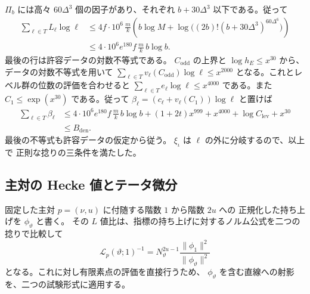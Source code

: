 \(\Pi_b\) には高々 \(60\Delta^3\) 個の因子があり、それぞれ
\(b+30\Delta^3\) 以下である。従って
\[
 \begin{split}
 \sum_{\ell\in T} L_\ell\log\ell
 &\le 4f\cdot10^6\,\frac{m}{k}
      \left(b\log M+\log\big((2b)!(b+30\Delta^3)^{60\Delta^6}\big)\right)\\
 &\le 4\cdot10^6 e^{180} f\,\frac{m}{k}\,b\log b .
 \end{split}
\]
最後の行は許容データの対数不等式である。
\(C_{\mathrm{odd}}\) の上界と \(\log h_E\le x^{30}\) から、
データの対数不等式を用いて
\(\sum_{\ell\in T}v_\ell(C_{\mathrm{odd}})\log\ell\le x^{2000}\)
となる。これとレベル群の位数の評価を合わせると
\(\sum_{\ell\in T} e_\ell\log\ell\le x^{4000}\) である。また
\(C_1\le\exp(x^{30})\) である。従って
\(\beta_\ell=(c_\ell+v_\ell(C_1))\log\ell\) と置けば
\[
 \begin{split}
 \sum_{\ell\in T}\beta_\ell
 &\le 4\cdot10^6 e^{180} f\,\frac{m}{k}\,b\log b
          +(1+2t)x^{999}+x^{4000}+\log C_{\mathrm{lev}}+x^{30}\\
 &\le B_{\mathrm{den}} .
 \end{split}
\]
最後の不等式も許容データの仮定から従う。
\(\xi_\iota\) は \(\ell\) の外に分岐するので、以上で
正則な捻りの三条件を満たした。

\subsection{主対の Hecke 値とテータ微分}

固定した主対 \(p=(\nu,u)\) に付随する階数 \(1\) から階数 \(2u\) への
正規化した持ち上げを \(\phi_\vartheta\) と書く。
その \(L\) 値比は、指標の持ち上げに対するノルム公式を二つの
捻りで比較して
\begin{equation}
 \mathcal L_p(\vartheta;1)^{-1}
   =N_\vartheta^{2u-1}\frac{\|\phi_1\|^2}{\|\phi_\vartheta\|^2}
 \label{eq:main-pair-norm}
\end{equation}
となる。これに対し有限素点の評価を直接行うため、
\(\phi_\vartheta\) を含む直線への射影を、二つの試験形式に適用する。



